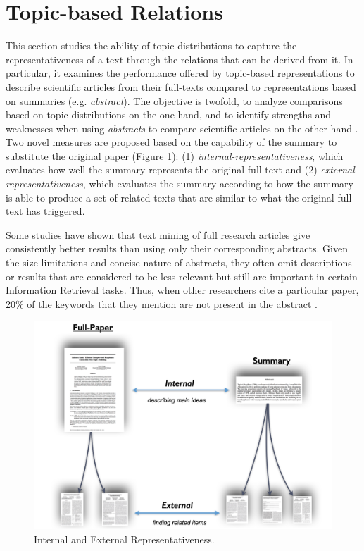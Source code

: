 \section{Topic-based Relations}
\label{sec:topic-relations}

This section studies the ability of topic distributions to capture the representativeness of a text through the relations that can be derived from it. In particular, it examines the performance offered by topic-based representations to describe scientific articles from their full-texts compared to representations based on summaries (e.g. \textit{abstract}). The objective is twofold, to analyze comparisons based on topic distributions on the one hand, and to identify strengths and weaknesses when using \textit{abstracts} to compare scientific articles on the other hand . Two novel measures are proposed based on the capability of the summary to substitute the original paper (Figure \ref{fig:representativeness}): (1) \textit{internal-representativeness}, which evaluates how well the summary represents the original full-text and (2) \textit{external-representativeness}, which evaluates the summary according to how the summary is able to produce a  set of related texts that are similar to what the original full-text has triggered.

Some studies \citep{Westergaard2017, Sciences2016} have shown that text mining of full research articles give consistently better results than using only their corresponding abstracts. Given the size limitations and concise nature of abstracts, they often omit descriptions or results that are considered to be less relevant but still are important in certain Information Retrieval tasks. Thus, when other researchers cite a particular paper, 20\% of the keywords that they mention are not present in the abstract \citep{Divoli2012}.

\begin{figure}[!htbp]
\centering
\includegraphics[scale=0.24]{internal-external.png}
\caption{Internal and External Representativeness. }
\label{fig:representativeness}
\end{figure}



